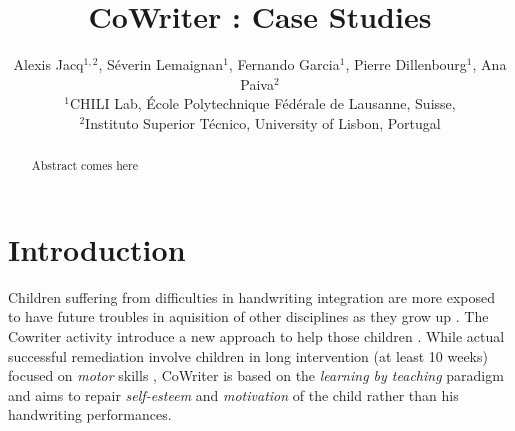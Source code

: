 \documentclass{sig-alternate}
\begin{document}

\title{CoWriter : Case Studies}

\author{Alexis Jacq$^{1,2}$, S\'everin Lemaignan$^1$, Fernando Garcia$^1$, Pierre Dillenbourg$^1$, Ana Paiva$^2$\\
$^1$CHILI Lab, \'Ecole Polytechnique F\'ed\'erale de Lausanne, Suisse,\\
$^2$Instituto Superior T\'{e}cnico, University of Lisbon, Portugal}


%
%


\maketitle
\begin{abstract}
Abstract comes here
\end{abstract}


\section{Introduction}

Children suffering from difficulties in handwriting integration are more exposed
to have future troubles in aquisition of other disciplines as they grow up
\cite{Christensen2005}. 
The Cowriter activity introduce a new approach to help those children
\cite{Hood}. While actual successful remediation involve children
in long intervention (at least 10 weeks) focused on \emph{motor} skills \cite{Hoy2011},
CoWriter is based on the \emph{learning by teaching} paradigm and aims to repair
\emph{self-esteem} and \emph{motivation} of the child rather than his
handwriting performances.
\end{document}
